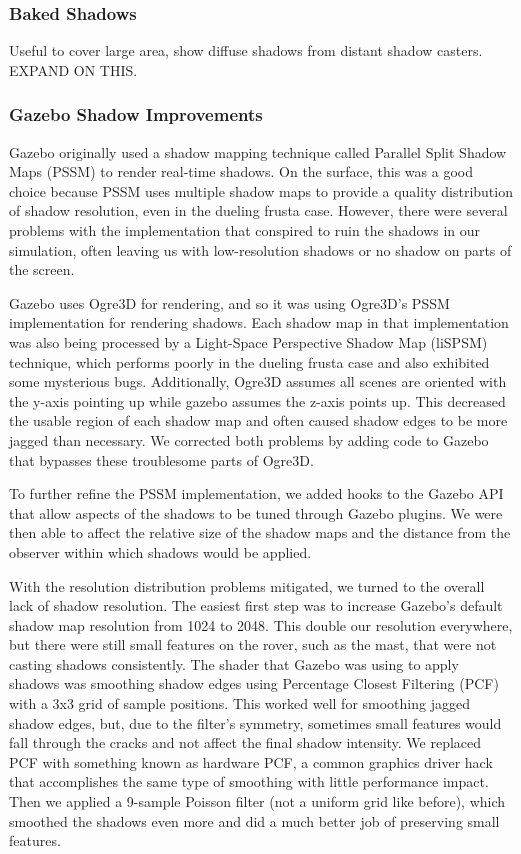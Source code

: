 \documentclass[twocolumn,letterpaper]{IEEEAerospaceCLS}  %
\begin{document}
\subsubsection{Baked Shadows}
Useful to cover large area, show diffuse shadows from distant shadow casters. EXPAND ON THIS.

\subsubsection{Gazebo Shadow Improvements}
Gazebo originally used a shadow mapping technique called Parallel Split Shadow Maps (PSSM) to render real-time shadows. On the surface, this was a good choice because PSSM uses multiple shadow maps to provide a quality distribution of shadow resolution, even in the dueling frusta case. However, there were several problems with the implementation that conspired to ruin the shadows in our simulation, often leaving us with low-resolution shadows or no shadow on parts of the screen.

Gazebo uses Ogre3D for rendering, and so it was using Ogre3D's PSSM implementation for rendering shadows. Each shadow map in that implementation was also being processed by a Light-Space Perspective Shadow Map (liSPSM) technique, which performs poorly in the dueling frusta case and also exhibited some mysterious bugs. Additionally, Ogre3D assumes all scenes are oriented with the y-axis pointing up while gazebo assumes the z-axis points up. This decreased the usable region of each shadow map and often caused shadow edges to be more jagged than necessary. We corrected both problems by adding code to Gazebo that bypasses these troublesome parts of Ogre3D.

To further refine the PSSM implementation, we added hooks to the Gazebo API that allow aspects of the shadows to be tuned through Gazebo plugins. We were then able to affect the relative size of the shadow maps and the distance from the observer within which shadows would be applied.

With the resolution distribution problems mitigated, we turned to the overall lack of shadow resolution. The easiest first step was to increase Gazebo's default shadow map resolution from 1024 to 2048. This double our resolution everywhere, but there were still small features on the rover, such as the mast, that were not casting shadows consistently. The shader that Gazebo was using to apply shadows was smoothing shadow edges using Percentage Closest Filtering (PCF) with a 3x3 grid of sample positions. This worked well for smoothing jagged shadow edges, but, due to the filter's symmetry, sometimes small features would fall through the cracks and not affect the final shadow intensity. We replaced PCF with something known as hardware PCF, a common graphics driver hack that accomplishes the same type of smoothing with little performance impact. Then we applied a 9-sample Poisson filter (not a uniform grid like before), which smoothed the shadows even more and did a much better job of preserving small features.
\end{document}
